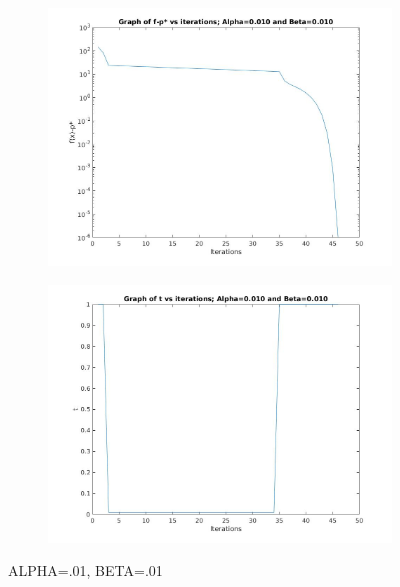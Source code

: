 \documentclass[12pt]{article}
\begin{document}
\begin{figure}[ht]
    \centering
    \begin{subfigure}{0.4\textwidth} %
        \includegraphics[width=\textwidth]{newton_f_alpha_01_beta_01.jpg}
    \end{subfigure}
    \vspace{1em} %
    \begin{subfigure}{0.4\textwidth} %
        \includegraphics[width=\textwidth]{newton_t_alpha_01_beta_01.jpg}
    \end{subfigure}
    \caption{ALPHA=.01, BETA=.01} %
\end{figure}
\end{document}
